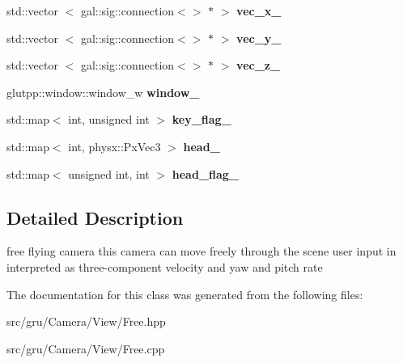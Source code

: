 \begin{DoxyCompactItemize}
\item 
\hypertarget{classglutpp_1_1Camera_1_1View_1_1Free_afba43b00b705064812505d58d81875a8}{std\-::vector\*
$<$ gal\-::sig\-::connection$<$$>$ $\ast$ $>$ {\bfseries vec\-\_\-x\-\_\-}}\label{classglutpp_1_1Camera_1_1View_1_1Free_afba43b00b705064812505d58d81875a8}

\item 
\hypertarget{classglutpp_1_1Camera_1_1View_1_1Free_a9ce29253552f9535753d6dac9b07f771}{std\-::vector\*
$<$ gal\-::sig\-::connection$<$$>$ $\ast$ $>$ {\bfseries vec\-\_\-y\-\_\-}}\label{classglutpp_1_1Camera_1_1View_1_1Free_a9ce29253552f9535753d6dac9b07f771}

\item 
\hypertarget{classglutpp_1_1Camera_1_1View_1_1Free_a0ab944629cc5c98f1d10a665a547cafd}{std\-::vector\*
$<$ gal\-::sig\-::connection$<$$>$ $\ast$ $>$ {\bfseries vec\-\_\-z\-\_\-}}\label{classglutpp_1_1Camera_1_1View_1_1Free_a0ab944629cc5c98f1d10a665a547cafd}

\item 
\hypertarget{classglutpp_1_1Camera_1_1View_1_1Free_a94621c66a51dea55cb1f2a25b433b508}{glutpp\-::window\-::window\-\_\-w {\bfseries window\-\_\-}}\label{classglutpp_1_1Camera_1_1View_1_1Free_a94621c66a51dea55cb1f2a25b433b508}

\item 
\hypertarget{classglutpp_1_1Camera_1_1View_1_1Free_a53c1787f79a27ab556cd2ceebe00f217}{std\-::map$<$ int, unsigned int $>$ {\bfseries key\-\_\-flag\-\_\-}}\label{classglutpp_1_1Camera_1_1View_1_1Free_a53c1787f79a27ab556cd2ceebe00f217}

\item 
\hypertarget{classglutpp_1_1Camera_1_1View_1_1Free_ad757176778e811180c8591720eeef4a7}{std\-::map$<$ int, physx\-::\-Px\-Vec3 $>$ {\bfseries head\-\_\-}}\label{classglutpp_1_1Camera_1_1View_1_1Free_ad757176778e811180c8591720eeef4a7}

\item 
\hypertarget{classglutpp_1_1Camera_1_1View_1_1Free_aed05795815a16e4c315b7fe08340a511}{std\-::map$<$ unsigned int, int $>$ {\bfseries head\-\_\-flag\-\_\-}}\label{classglutpp_1_1Camera_1_1View_1_1Free_aed05795815a16e4c315b7fe08340a511}

\end{DoxyCompactItemize}


\subsection{\-Detailed \-Description}
free flying camera this camera can move freely through the scene user input in interpreted as three-\/component velocity and yaw and pitch rate 

\-The documentation for this class was generated from the following files\-:\begin{DoxyCompactItemize}
\item 
src/gru/\-Camera/\-View/\-Free.\-hpp\item 
src/gru/\-Camera/\-View/\-Free.\-cpp\end{DoxyCompactItemize}
